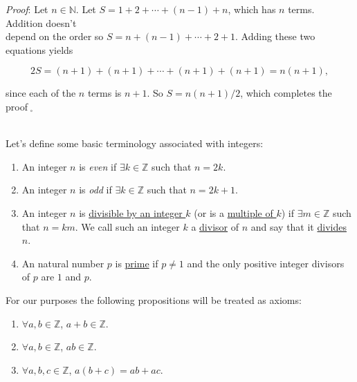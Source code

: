 \documentclass[12pt]{amsart}
\theoremstyle{definition}
\theoremstyle{remark}
\newcommand{\nats}{\mathbb N}
\newcommand{\ints}{\mathbb Z}
\begin{document}
\bigskip

\emph{Proof}:  Let $n\in\nats$.  Let $S=1+2+\cdots +(n-1)+n$, which has $n$ terms.   Addition doesn't\\

 depend on the order so $S=n+(n-1)+\cdots +2+1$.  Adding these two equations yields 
 
 $$2S=(n+1)+(n+1)+\cdots +(n+1)+(n+1)=n(n+1),$$

\medskip

since each of the $n$ terms is $n+1$.  So $S=n(n+1)/2$, which completes the proof$\;_{\square}$\\ \\

\newpage

Let's define some basic terminology associated with integers:\\

\begin{enumerate}
\item  An integer $n$ is \emph{even} if $\exists k\in\ints$ such that $n=2k$.

\bigskip

\item  An integer $n$ is \emph{odd} if $\exists k\in\ints$ such that $n=2k+1$.

\bigskip

\item  An integer $n$ is \underline{divisible by an integer $k$} (or is a \underline{multiple of $k$}) if $\exists m\in\ints$ such that $n=km$.  We call such an integer $k$ a \underline{divisor} of $n$ and say that it \underline{divides} $n$.

\bigskip

\item  An natural number $p$ is \underline{prime} if $p\neq 1$ and the only positive integer divisors of $p$ are $1$ and $p$.

\end{enumerate}

\medskip

For our purposes the following propositions will be treated as axioms:\\

\begin{enumerate}

\item $\forall a,b\in\ints$, $a+b\in\ints$. \\

\item $\forall a,b\in\ints$, $ab\in\ints$. \\

\item $\forall a,b,c\in\ints$, $a(b+c)=ab+ac$.\\

\end{enumerate}
\end{document}
